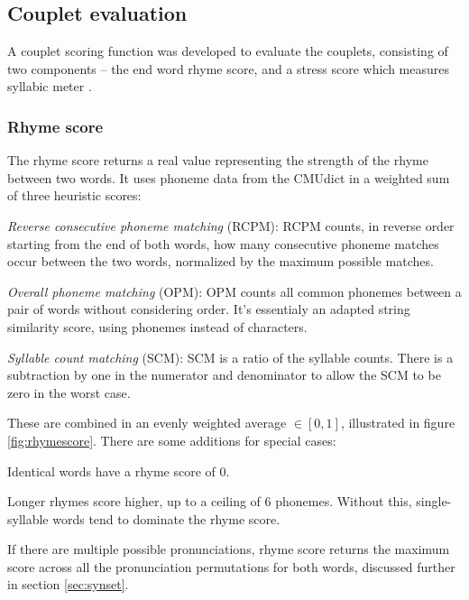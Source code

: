 \documentclass[11pt,a4paper]{article}
\newenvironment{tight_enumerate}{
\begin{enumerate}
\setlength{\itemsep}{0pt}
\setlength{\parskip}{0pt}
}{\end{enumerate}}
\newenvironment{tight_itemize}{
\begin{itemize}
\setlength{\itemsep}{0pt}
\setlength{\parskip}{0pt}
}{\end{itemize}}
\begin{document}
\subsection{Couplet evaluation}
\label{sec:coupleteval}

A couplet scoring function was developed to evaluate the couplets, consisting of two components -- the end word rhyme score, and a stress score which measures syllabic meter \cite{meter_def}.

\subsubsection{Rhyme score}
\label{sec:rhymescore}

The rhyme score returns a real value representing the strength of the rhyme between two words. It uses phoneme data from the CMUdict in a weighted sum of three heuristic scores:
\begin{tight_itemize}
	\vspace{-0.5em}
	\item \textit{Reverse consecutive phoneme matching} (RCPM):
	RCPM counts, in reverse order starting from the end of both words, how many consecutive phoneme matches occur between the two words, normalized by the maximum possible matches.
	\item \textit{Overall phoneme matching} (OPM):
		OPM counts all common phonemes between a pair of words without considering order. It's essentialy an adapted \citet{ratcliff} string similarity score, using phonemes instead of characters.
	\item \textit{Syllable count matching} (SCM):
	SCM is a ratio of the syllable counts. There is a subtraction by one in the numerator and denominator to allow the SCM to be zero in the worst case.
\end{tight_itemize}

These are combined in an evenly weighted average $\in [0, 1]$, illustrated in figure \ref{fig:rhymescore}. There are some additions for special cases:
\begin{tight_enumerate}
	\vspace{-0.5em}
	\item
		Identical words have a rhyme score of 0.
	\item
		Longer rhymes score higher, up to a ceiling of 6 phonemes. Without this, single-syllable words tend to dominate the rhyme score.
	\item
		If there are multiple possible pronunciations, rhyme score returns the maximum score across all the pronunciation permutations for both words, discussed further in section \ref{sec:synset}.
\end{tight_enumerate}
\end{document}
